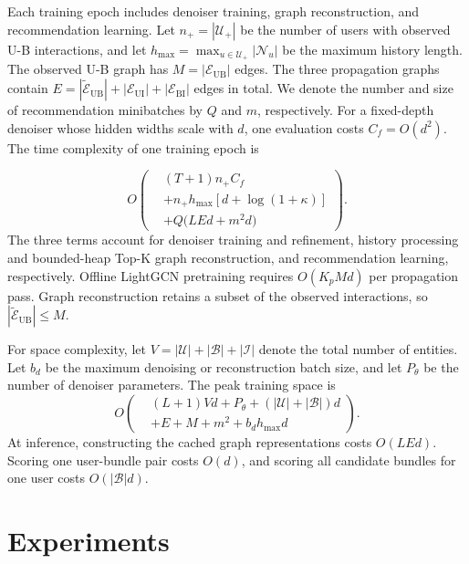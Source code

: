 \documentclass[letterpaper,journal]{IEEEtran}
\begin{document}
Each training epoch includes denoiser training, graph reconstruction, and recommendation learning. Let $n_+=|\mathcal U_+|$ be the number of users with observed U-B interactions, and let $h_{\max}=\max_{u\in\mathcal U_+}|\mathcal N_u|$ be the maximum history length. The observed U-B graph has $M=|\mathcal E_{\mathrm{UB}}|$ edges. The three propagation graphs contain $E=|\widetilde{\mathcal E}_{\mathrm{UB}}|+|\mathcal E_{\mathrm{UI}}|+|\mathcal E_{\mathrm{BI}}|$ edges in total. We denote the number and size of recommendation minibatches by $Q$ and $m$, respectively. For a fixed-depth denoiser whose hidden widths scale with $d$, one evaluation costs $C_f=O(d^2)$. The time complexity of one training epoch is

\begin{equation}
O\!\left(
\begin{aligned}
&(T+1)n_+C_f\\
&+n_+h_{\max}\!\left[d+\log(1+\kappa)\right]\\
&+Q\bigl(LEd+m^2d\bigr)
\end{aligned}
\right).
\tag{22}
\end{equation}
The three terms account for denoiser training and refinement, history processing and bounded-heap Top-K graph reconstruction, and recommendation learning, respectively. Offline LightGCN pretraining requires $O(K_pMd)$ per propagation pass. Graph reconstruction retains a subset of the observed interactions, so $|\widetilde{\mathcal E}_{\mathrm{UB}}|\leq M$.

For space complexity, let $V=|\mathcal U|+|\mathcal B|+|\mathcal I|$ denote the total number of entities. Let $b_d$ be the maximum denoising or reconstruction batch size, and let $P_\theta$ be the number of denoiser parameters. The peak training space is
\begin{equation}
O\!\left(
\begin{aligned}
&(L+1)Vd+P_\theta+(|\mathcal U|+|\mathcal B|)d\\
&+E+M+m^2+b_dh_{\max}d
\end{aligned}
\right).
\tag{23}
\end{equation}
At inference, constructing the cached graph representations costs $O(LEd)$. Scoring one user-bundle pair costs $O(d)$, and scoring all candidate bundles for one user costs $O(|\mathcal B|d)$.

\section{Experiments}
\end{document}
